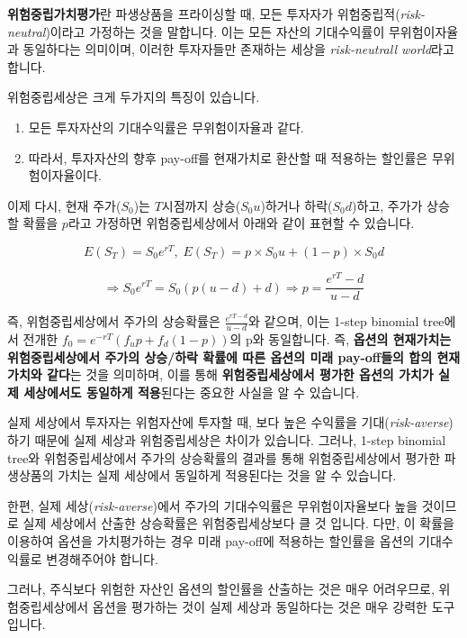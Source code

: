 \documentclass[
  letterpaper,
  DIV=11,
  numbers=noendperiod]{scrreprt}
\providecommand{\tightlist}{%
  \setlength{\itemsep}{0pt}\setlength{\parskip}{0pt}}\usepackage{longtable,booktabs,array}
\begin{document}
\textbf{위험중립가치평가}란 파생상품을 프라이싱할 때, 모든 투자자가
위험중립적(\emph{risk-neutral})이라고 가정하는 것을 말합니다. 이는 모든
자산의 기대수익률이 무위험이자율과 동일하다는 의미이며, 이러한
투자자들만 존재하는 세상을 \emph{risk-neutrall world}라고 합니다.

위험중립세상은 크게 두가지의 특징이 있습니다.

\begin{enumerate}
\def\labelenumi{(\arabic{enumi})}
\tightlist
\item
  모든 투자자산의 기대수익률은 무위험이자율과 같다.
\item
  따라서, 투자자산의 향후 pay-off를 현재가치로 환산할 때 적용하는
  할인률은 무위험이자율이다.
\end{enumerate}

이제 다시, 현재 주가(\(S_0\))는 \(T\)시점까지 상승(\(S_0u\))하거나
하락(\(S_0d\))하고, 주가가 상승할 확률을 \(p\)라고 가정하면
위험중립세상에서 아래와 같이 표현할 수 있습니다.

\[E(S_T)=S_0e^{rT},\;E(S_T)=p\times S_0u+(1-p)\times S_0d\]

\[\Rightarrow S_0e^{rT}=S_0(p(u-d)+d)\Rightarrow p=\frac{e^{rT}-d}{u-d}\]

즉, 위험중립세상에서 주가의 상승확률은 \(\frac{e^{rT-d}}{u-d}\)와
같으며, 이는 1-step binomial tree에서 전개한
\(f_0=e^{-rT}(f_up+f_d(1-p))\)의 p와 동일합니다. 즉, \textbf{옵션의
현재가치는 위험중립세상에서 주가의 상승/하락 확률에 따른 옵션의 미래
pay-off들의 합의 현재가치와 같다}는 것을 의미하며, 이를 통해
\textbf{위험중립세상에서 평가한 옵션의 가치가 실제 세상에서도 동일하게
적용}된다는 중요한 사실을 알 수 있습니다.

\begin{tcolorbox}[enhanced jigsaw, titlerule=0mm, bottomtitle=1mm, left=2mm, title=\textcolor{quarto-callout-tip-color}{\faLightbulb}\hspace{0.5em}{Tip}, toptitle=1mm, bottomrule=.15mm, colframe=quarto-callout-tip-color-frame, breakable, opacityback=0, rightrule=.15mm, opacitybacktitle=0.6, coltitle=black, colback=white, arc=.35mm, colbacktitle=quarto-callout-tip-color!10!white, toprule=.15mm, leftrule=.75mm]

실제 세상에서 투자자는 위험자산에 투자할 때, 보다 높은 수익률을
기대(\emph{risk-averse})하기 때문에 실제 세상과 위험중립세상은 차이가
있습니다. 그러나, 1-step binomial tree와 위험중립세상에서 주가의
상승확률의 결과를 통해 위험중립세상에서 평가한 파생상품의 가치는 실제
세상에서 동일하게 적용된다는 것을 알 수 있습니다.

한편, 실제 세상(\emph{risk-averse})에서 주가의 기대수익률은
무위험이자율보다 높을 것이므로 실제 세상에서 산출한 상승확률은
위험중립세상보다 클 것 입니다. 다만, 이 확률을 이용하여 옵션을
가치평가하는 경우 미래 pay-off에 적용하는 할인률을 옵션의 기대수익률로
변경해주어야 합니다.

그러나, 주식보다 위험한 자산인 옵션의 할인률을 산출하는 것은 매우
어려우므로, 위험중립세상에서 옵션을 평가하는 것이 실제 세상과 동일하다는
것은 매우 강력한 도구입니다.

\end{tcolorbox}
\end{document}
